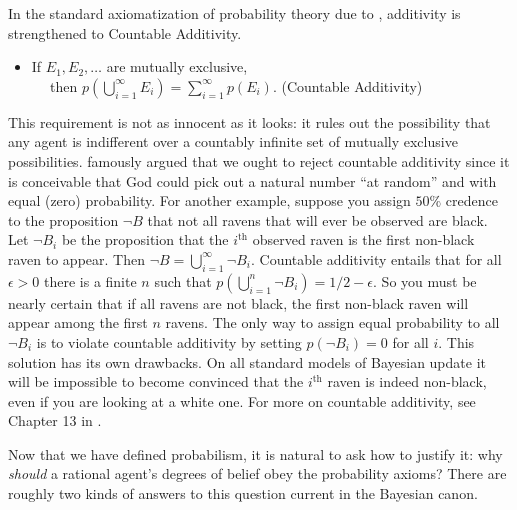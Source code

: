 In the standard axiomatization of probability theory due to
\citet{kolmogorov1950foundations}, additivity is strengthened to Countable
Additivity.
\begin{itemize}
\item[] If $E_1, E_2, \ldots$ are mutually
exclusive,\\$\phantom{M}$\hspace{1.5em} then $p(\bigcup_{i=1}^\infty E_i) =
\sum_{i=1}^\infty p(E_i)$. \hfill(Countable Additivity)
\end{itemize}
This requirement is not as innocent as it looks: it rules out the possibility
that any agent is indifferent over a countably infinite set of mutually
exclusive possibilities. 
famously argued that we ought to reject countable additivity since it is
conceivable that God could pick out a natural number ``at random'' and with
equal (zero) probability. For another example, suppose you assign $50\%$
credence to the proposition $\neg B$ that not all ravens that will ever be
observed are black. Let $\neg B_i$ be the proposition that the $i^\text{th}$
observed raven is the first non-black raven to appear. Then $\neg B =
\bigcup_{i=1}^\infty \neg B_i.$ Countable additivity entails that for all
$\epsilon>0$ there is a finite $n$ such that $p(\bigcup_{i=1}^n \neg B_i) = 1/2
-\epsilon.$ So you must be nearly certain that if all ravens are not black, the
first non-black raven will appear among the first $n$ ravens. The only way to
assign equal probability to all $\neg B_i$ is to violate countable additivity by
setting $p(\neg B_i)=0$ for all $i$. This solution has its own drawbacks. On all
standard models of Bayesian update it will be impossible to become convinced
that the $i^\text{th}$ raven is indeed non-black, even if you are looking at a
white one. For more on countable additivity, see Chapter 13 in
\citet{kelly1996logic}.

Now that we have defined probabilism, it is natural to ask how to justify it:
why {\em should} a rational agent's degrees of belief obey the probability
axioms? There are roughly two kinds of answers to this question current in the
Bayesian canon.

